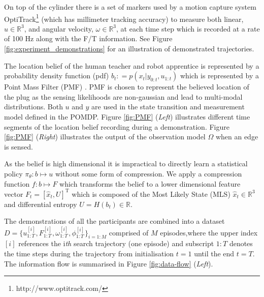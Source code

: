 \documentclass[final,5p,times,twocolumn]{elsarticle}
\begin{document}
On top of the cylinder there is a set of markers used by a motion capture system 
OptiTrack\footnote{http://www.optitrack.com/} (which has millimeter tracking accuracy) to measure 
both linear, $u \in \mathbb{R}^3$, and angular velocity, $\omega \in \mathbb{R}^3$, at each 
time step which is recorded at a rate of 100 Hz along with the F/T information. See Figure \ref{fig:experiment_demonstrations}
for an illustration of demonstrated trajectories.


The location belief of the human teacher and robot apprentice is represented by a probability density function (pdf) ${b_t: = p(x_t|y_{0:t},u_{1:t})}$
which is represented by a Point Mass Filter (PMF) \cite[p.87]{Bergman99recursivebayesian}. PMF is chosen to represent the 
believed location of the plug as the sensing likelihoods are non-gaussian and lead to multi-modal distributions. 
Both $u$ and $y$ are used in the state transition and measurement model defined in the POMDP. Figure \ref{fig:PMF} (\textit{Left}) 
illustrates different time segments of the location belief recording during a demonstration. 
Figure \ref{fig:PMF} (\textit{Right}) illustrates the output of the observation model $\Omega$ when an edge is sensed. 

As the belief is high dimensional it is impractical to directly learn a statistical policy ${\pi_{\theta} : b \mapsto u }$ without 
some form of compression. We apply a compression function ${f : b \mapsto F}$ which transforms the belief to a lower 
dimensional feature vector  ${F_t = [\hat{x}_t,U]^{\mathrm{T}}}$ which is composed of 
the Most Likely State (MLS) ${\hat{x}_t \in \mathbb{R}^3}$ and differential entropy ${U = H(b_t) \in \mathbb{R}}$.

The demonstrations of all the participants are combined into a dataset ${D=\{u^{[i]}_{1:T},F^{[i]}_{1:T},\omega^{[i]}_{1:T},\phi^{[i]}_{1:T}\}_{i=1:M}}$
comprised of $M$ episodes,where the upper index $[i]$ references the i\textit{th} search trajectory (one episode) and subscript ${1:T}$ denotes the time 
steps during the trajectory from initialisation $t=1$ until the end $t=T$. The information  flow is summarised in
Figure \ref{fig:data-flow} (\textit{Left}).
\end{document}

